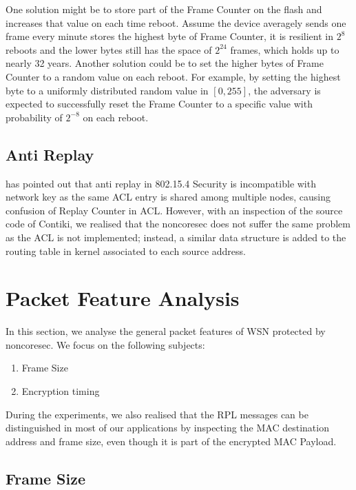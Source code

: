 One solution might be to store part of the Frame Counter on the flash and increases that value on each time reboot. Assume the device averagely sends one frame every minute stores the highest byte of Frame Counter, it is resilient in $2^8$ reboots and the lower bytes still has the space of $2^{24}$ frames, which holds up to nearly 32 years. Another solution could be to set the higher bytes of Frame Counter to a random value on each reboot. For example, by setting the highest byte to a uniformly distributed random value in $[0,255]$, the adversary is expected to successfully reset the Frame Counter to a specific value with probability of $2^{-8}$ on each reboot.

\subsection{Anti Replay}

\cite{802154sec} has pointed out that anti replay in 802.15.4 Security is incompatible with network key as the same ACL entry is shared among multiple nodes, causing confusion of Replay Counter in ACL. However, with an inspection of the source code of Contiki, we realised that the noncoresec does not suffer the same problem as the ACL is not implemented; instead, a similar data structure is added to the routing table in kernel  associated to each source address.

\section{Packet Feature Analysis}

In this section, we analyse the general packet features of WSN protected by noncoresec. We focus on the following subjects:

\begin{enumerate}
	\item Frame Size
	\item Encryption timing
\end{enumerate}

During the experiments, we also realised that the RPL messages can be distinguished in most of our applications by inspecting the MAC destination address and frame size, even though it is part of the encrypted MAC Payload.

\subsection{Frame Size} 

